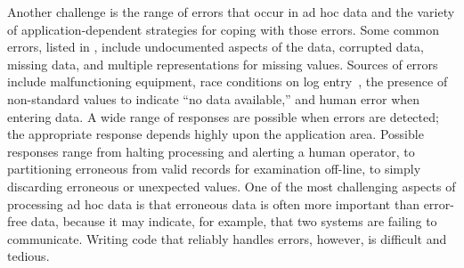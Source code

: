 Another challenge is the range of errors that occur in ad hoc data and
the variety of application-dependent strategies for coping with those errors.
Some common errors, listed in , include
undocumented aspects of the data, corrupted data, missing data, and
multiple representations for missing values.  Sources of errors
include malfunctioning equipment, race conditions on log
entry~\cite{wpp}, the presence of non-standard values to indicate ``no
data available,'' and human error when entering data.  A wide range of
responses are possible when errors are detected; the appropriate
response depends highly upon the application area. Possible responses
range from halting processing and alerting a human operator, to
partitioning erroneous from valid records for examination off-line, to
simply discarding erroneous or unexpected values.  One of the most
challenging aspects of processing ad hoc data is that erroneous data
is often more important than error-free data, because it may indicate,
for example, that two systems are failing to communicate.  Writing
code that reliably handles errors, however, is difficult and tedious.


